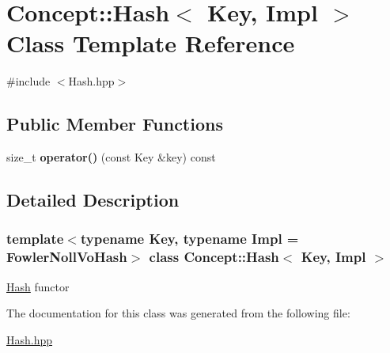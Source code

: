 \hypertarget{class_concept_1_1_hash}{}\section{Concept\+::Hash$<$ Key, Impl $>$ Class Template Reference}
\label{class_concept_1_1_hash}


{\ttfamily \#include $<$Hash.\+hpp$>$}

\subsection*{Public Member Functions}
\begin{DoxyCompactItemize}
\item 
\mbox{\label{class_concept_1_1_hash_a3712f3a89463302198339adbff08b5be}} 
size\+\_\+t {\bfseries operator()} (const Key \&key) const
\end{DoxyCompactItemize}


\subsection{Detailed Description}
\subsubsection*{template$<$typename Key, typename Impl = Fowler\+Noll\+Vo\+Hash$>$\newline
class Concept\+::\+Hash$<$ Key, Impl $>$}

\mbox{\hyperlink{class_concept_1_1_hash}{Hash}} functor 

The documentation for this class was generated from the following file\+:\begin{DoxyCompactItemize}
\item 
\mbox{\hyperlink{_hash_8hpp}{Hash.\+hpp}}\end{DoxyCompactItemize}
